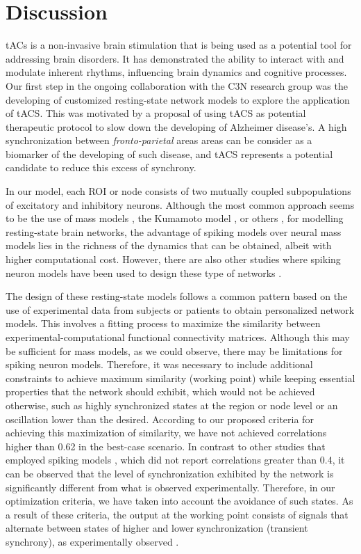 \documentclass[../main.tex]{subfiles}
\begin{document}
\section{Discussion}
tACs is a non-invasive brain stimulation that is being used as a potential tool for addressing brain disorders.
It has demonstrated the ability to interact with and modulate inherent rhythms, influencing brain dynamics and cognitive processes.
Our first step in the ongoing collaboration with the C3N research group was the developing of customized resting-state network models to explore the application of tACS.
This was motivated by a proposal of using tACS as potential therapeutic protocol to slow down the developing of Alzheimer disease's.
A high synchronization between \textit{fronto-parietal} areas areas can be consider as a biomarker of the developing of such disease, and tACS represents a potential candidate to reduce this excess of synchrony.

In our model, each ROI or node  consists of two mutually coupled subpopulations of excitatory and inhibitory neurons.
Although the most common approach seems to be the use of mass models \citep{deco_key_2009,cabral2014exploring, cabrera-alvarez_modeling_2023}, the Kumamoto model \citep{cabral_role_2011}, or others \citep{honey_network_2007}, for modelling resting-state brain networks, the advantage of spiking models over neural mass models lies in the richness of the dynamics that can be obtained, albeit with higher computational cost.
However, there are also other studies where spiking neuron models have been used to design these type of networks \citep{deco_ongoing_2012,nakagawa_how_2014}.

The design of these resting-state models follows a common pattern based on the use of experimental data from subjects or patients to obtain personalized network models.
This involves a fitting process to maximize the similarity between experimental-computational functional connectivity matrices.
Although this may be sufficient for mass models, as we could observe, there may be limitations for spiking neuron models.
Therefore, it was necessary to include additional constraints to achieve maximum similarity (working point) while keeping essential properties that the network should exhibit, which would not be achieved otherwise, such as highly synchronized states at the region or node level or an oscillation lower than the desired.
According to our proposed criteria for achieving this maximization of similarity, we have not achieved correlations higher than 0.62 in the best-case scenario.
In contrast to other studies that employed spiking models \citep{nakagawa_how_2014}, which did not report correlations greater than 0.4, it can be observed that the level of synchronization exhibited by the network is significantly different from what is observed experimentally.
Therefore, in our optimization criteria, we have taken into account the avoidance of such states.
As a result of these criteria, the output at the working point consists of signals that alternate between states of higher and lower synchronization (transient synchrony), as experimentally observed \citep{scheeringa2012eeg,palmigiano_flexible_2017-1, rhodes_transient_2018}.
\end{document}
